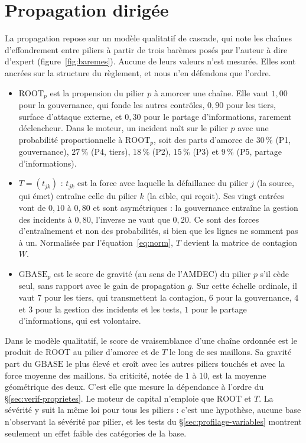 
\section{Propagation dirigée}
\label{sec:baremes}

La propagation repose sur un modèle qualitatif de cascade, qui note les chaînes d'effondrement
entre piliers à partir de trois barèmes posés par l'auteur à dire d'expert
(figure~\ref{fig:baremes}). Aucune de leurs valeurs n'est mesurée. Elles sont ancrées sur la
structure du règlement, et nous n'en défendons que l'ordre.
\begin{itemize}[leftmargin=*,itemsep=2pt]
\item $\mathrm{ROOT}_p$ est la propension du pilier $p$ à amorcer une chaîne. Elle vaut $1{,}00$
  pour la gouvernance, qui fonde les autres contrôles, $0{,}90$ pour les tiers, surface d'attaque
  externe, et $0{,}30$ pour le partage d'informations, rarement déclencheur. Dans le moteur, un
  incident naît sur le pilier $p$ avec une probabilité proportionnelle à $\mathrm{ROOT}_p$, soit
  des parts d'amorce de $30\,\%$ (P1, gouvernance), $27\,\%$ (P4, tiers), $18\,\%$ (P2), $15\,\%$
  (P3) et $9\,\%$ (P5, partage d'informations).
\item $T=(t_{jk})$ : $t_{jk}$ est la force avec laquelle la défaillance du pilier $j$ (la source, qui émet) entraîne celle
  du pilier $k$ (la cible, qui reçoit). Ses vingt entrées vont de $0{,}10$ à $0{,}80$ et sont asymétriques : la
  gouvernance entraîne la gestion des incidents à $0{,}80$, l'inverse ne vaut que $0{,}20$. Ce
  sont des forces d'entraînement et non des probabilités, si bien que les lignes ne somment pas à
  un. Normalisée par l'équation~\eqref{eq:norm}, $T$ devient la matrice de contagion
  $W$.
\item $\mathrm{GBASE}_p$ est le score de gravité (au sens de l'AMDEC) du pilier $p$ s'il cède seul,
  sans rapport avec le gain de propagation $g$. Sur cette échelle ordinale, il vaut $7$ pour les tiers, qui transmettent la contagion, $6$ pour la gouvernance, $4$ et
  $3$ pour la gestion des incidents et les tests, $1$ pour le partage d'informations, qui est
  volontaire.
\end{itemize}
Dans le modèle qualitatif, le score de vraisemblance d'une chaîne ordonnée est le produit de $\mathrm{ROOT}$
au pilier d'amorce et de $T$ le long de ses maillons. Sa gravité part du
$\mathrm{GBASE}$ le plus élevé et croît avec les autres piliers touchés et avec la force moyenne des
maillons. Sa criticité, notée de $1$ à $10$, est la moyenne géométrique des deux. C'est elle que
mesure la dépendance à l'ordre du \S\ref{sec:verif-proprietes}. Le moteur de capital n'emploie que
$\mathrm{ROOT}$ et $T$. La sévérité y suit la même loi pour tous les piliers : c'est
une hypothèse, aucune base n'observant la sévérité par pilier, et les tests du
\S\ref{sec:profilage-variables} montrent seulement un effet faible des catégories de la base.

